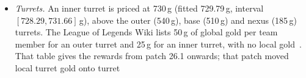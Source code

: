 \begin{itemize}
  applies is .
\item \emph{Turrets.} An inner turret is priced at 730\,g (fitted 729.79\,g, interval
  $[728.29, 731.66]$\,g), above the outer (540\,g), base (510\,g) and nexus (185\,g) turrets.
  The League of Legends Wiki lists 50\,g of global gold per team member for an outer turret and
  25\,g for an inner turret, with no local gold~\cite{lolwiki2026turret}. That table gives the
  rewards from patch 26.1 onwards; that patch moved local turret gold onto turret

\end{itemize}
